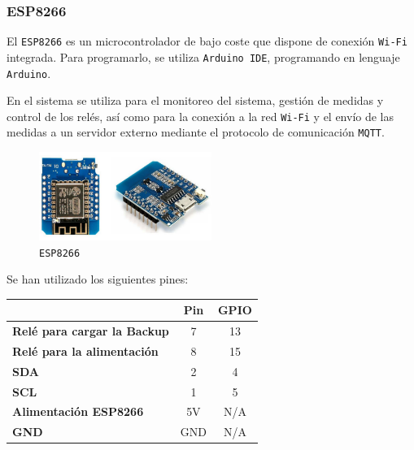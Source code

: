 \subsubsection{ESP8266}

El \texttt{ESP8266} es un microcontrolador de bajo coste que dispone de conexión \texttt{Wi-Fi} integrada. Para programarlo, se utiliza \texttt{Arduino IDE}, programando en lenguaje \texttt{Arduino}. \cite{espressifsystemsESPRESSIFSMARTCONNECTIVITY}

En el sistema se utiliza para el monitoreo del sistema, gestión de medidas y control de los relés, así como para la conexión a la red \texttt{Wi-Fi} y el envío de las medidas a un servidor externo mediante el protocolo de comunicación \texttt{MQTT}.

\begin{figure}[H]
    \centering
    \includegraphics[width=0.5\textwidth]{images/2-hardware/componentes/ESP8266.png}
    \caption{\texttt{ESP8266}}
    \label{fig:hardware/modulos/esp8266}
\end{figure}

Se han utilizado los siguientes pines:

\begin{table}[H]
    \centering
    \begin{tabular}{l|c|c|}
    \cline{2-3}
                                                              & \textbf{Pin} & \textbf{GPIO} \\ \hline
    \multicolumn{1}{|l|}{\textbf{Relé para cargar la Backup}} & 7            & 13            \\ \hline
    \multicolumn{1}{|l|}{\textbf{Relé para la alimentación}}  & 8            & 15            \\ \hline
    \multicolumn{1}{|l|}{\textbf{SDA}}                        & 2            & 4             \\ \hline
    \multicolumn{1}{|l|}{\textbf{SCL}}                        & 1            & 5             \\ \hline
    \multicolumn{1}{|l|}{\textbf{Alimentación ESP8266}}       & 5V           & N/A           \\ \hline
    \multicolumn{1}{|l|}{\textbf{GND}}                        & GND          & N/A           \\ \hline
    \end{tabular}
\end{table}


